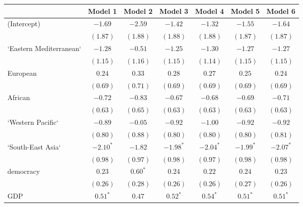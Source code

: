
\begin{table}[!h]
\begin{center}
\begin{tabular}{l c c c c c c }
\toprule
 & Model 1 & Model 2 & Model 3 & Model 4 & Model 5 & Model 6 \\
\midrule
(Intercept)             & $-1.69$      & $-2.59$      & $-1.42$      & $-1.32$      & $-1.55$      & $-1.64$      \\
                        & $(1.87)$     & $(1.88)$     & $(1.88)$     & $(1.88)$     & $(1.87)$     & $(1.87)$     \\
`Eastern Mediterranean` & $-1.28$      & $-0.51$      & $-1.25$      & $-1.30$      & $-1.27$      & $-1.27$      \\
                        & $(1.15)$     & $(1.16)$     & $(1.15)$     & $(1.14)$     & $(1.15)$     & $(1.15)$     \\
European                & $0.24$       & $0.33$       & $0.28$       & $0.27$       & $0.25$       & $0.24$       \\
                        & $(0.69)$     & $(0.71)$     & $(0.69)$     & $(0.69)$     & $(0.69)$     & $(0.69)$     \\
African                 & $-0.72$      & $-0.83$      & $-0.67$      & $-0.68$      & $-0.69$      & $-0.71$      \\
                        & $(0.63)$     & $(0.65)$     & $(0.63)$     & $(0.63)$     & $(0.63)$     & $(0.63)$     \\
`Western Pacific`       & $-0.89$      & $-0.05$      & $-0.92$      & $-1.00$      & $-0.92$      & $-0.92$      \\
                        & $(0.80)$     & $(0.88)$     & $(0.80)$     & $(0.80)$     & $(0.80)$     & $(0.81)$     \\
`South-East Asia`       & $-2.10^{*}$  & $-1.82$      & $-1.98^{*}$  & $-2.04^{*}$  & $-1.99^{*}$  & $-2.07^{*}$  \\
                        & $(0.98)$     & $(0.97)$     & $(0.98)$     & $(0.97)$     & $(0.98)$     & $(0.98)$     \\
democracy               & $0.23$       & $0.60^{*}$   & $0.24$       & $0.22$       & $0.24$       & $0.23$       \\
                        & $(0.26)$     & $(0.28)$     & $(0.26)$     & $(0.26)$     & $(0.27)$     & $(0.26)$     \\
GDP                     & $0.51^{*}$   & $0.47$       & $0.52^{*}$   & $0.54^{*}$   & $0.51^{*}$   & $0.51^{*}$   \\

\end{tabular}
\end{center}
\end{table}
